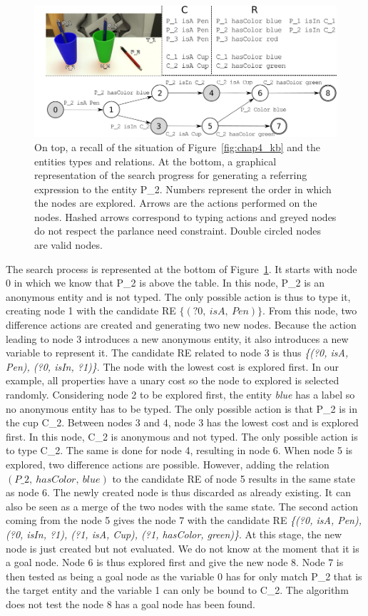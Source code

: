 \begin{figure}[h!]
\centering
\includegraphics[scale=0.45]{figures/chapter4/search.png}
\caption{\label{fig:chap4_search} On top, a recall of the situation of Figure~\ref{fig:chap4_kb} and the entities types and relations.
At the bottom, a graphical representation of the search progress for generating a referring expression to the entity P\_2. Numbers represent the order in which the nodes are explored. Arrows are the actions performed on the nodes. Hashed arrows correspond to typing actions and greyed nodes do not respect the parlance need constraint. Double circled nodes are valid nodes. }
\end{figure}

The search process is represented at the bottom of Figure~\ref{fig:chap4_search}. It starts with node 0 in which we know that P\_2 is above the table. In this node, P\_2 is an anonymous entity and is not typed. The only possible action is thus to type it, creating node 1 with the candidate RE $\{(?0,\ isA,\ Pen)\}$. From this node, two difference actions are created and generating two new nodes. Because the action leading to node 3 introduces a new anonymous entity, it also introduces a new variable to represent it. The candidate RE related to node 3 is thus \textit{\{(?0, isA, Pen), (?0, isIn, ?1)\}}. The node with the lowest cost is explored first. In our example, all properties have a unary cost so the node to explored is selected randomly. Considering node 2 to be explored first, the entity \textit{blue} has a label so no anonymous entity has to be typed. The only possible action is that P\_2 is in the cup C\_2. Between nodes 3 and 4, node 3 has the lowest cost and is explored first. In this node, C\_2 is anonymous and not typed. The only possible action is to type C\_2. The same is done for node 4, resulting in node 6. When node 5 is explored, two difference actions are possible. However, adding the relation $(P\_2,\ hasColor,\ blue)$ to the candidate RE of node 5 results in the same state as node 6. The newly created node is thus discarded as already existing. It can also be seen as a merge of the two nodes with the same state. The second action coming from the node 5 gives the node 7 with the candidate RE \textit{\{(?0, isA, Pen), (?0, isIn, ?1), (?1, isA, Cup), (?1, hasColor, green)\}}. At this stage, the new node is just created but not evaluated. We do not know at the moment that it is a goal node. Node 6 is thus explored first and give the new node 8. Node 7 is then tested as being a goal node as the variable 0 has for only match P\_2 that is the target entity and the variable 1 can only be bound to C\_2. The algorithm does not test the node 8 has a goal node has been found.

